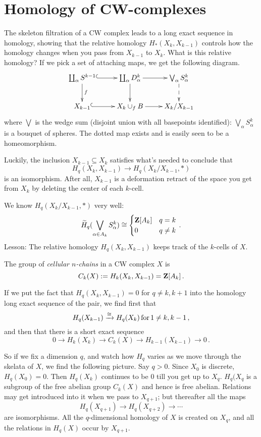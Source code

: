 \section{Homology of CW-complexes}


The skeleton filtration of a CW complex leads to a long exact sequence in 
homology, showing that the relative homology $H_*(X_k,X_{k-1})$ controls how
the homology changes when you  pass from $X_{k-1}$ to $X_k$. What is this
relative homology? If we pick a set of attaching maps, we get the following 
diagram.
\begin{equation*}
\xymatrix{\coprod_{\alpha}S^{k-1}\ar@{^(->}[r]\ar[d]^f & \coprod_{\alpha}D^k_\alpha\ar[r]\ar[d] & \bigvee_{\alpha}S^k_\alpha\ar@{-->}[d]\\
X_{k-1}\ar@{^(->}[r] & X_k\cup_f B\ar[r] & X_k/X_{k-1}}
\end{equation*}
where $\bigvee$ is the wedge sum (disjoint union with all basepoints identified): $\bigvee_{\alpha}S^k_\alpha$ is a bouquet of spheres. The dotted
map exists and is easily seen to be a homeomorphism. 

Luckily, the inclusion $X_{k-1}\subseteq X_k$ satisfies what's needed to conclude that 
\[
H_q(X_k,X_{k-1})\to H_q(X_k/X_{k-1},\ast)
\]
is an isomorphism. After all, $X_{k-1}$ is a deformation retract of the space 
you get from $X_k$ by deleting the center of each $k$-cell. 

We know $ H_q(X_k/X_{k-1},\ast)$ very well:
\[
\widetilde{ H}_q(\bigvee_{\alpha\in A_k}S^k_\alpha)\cong\begin{cases}\mathbf Z[A_k] & q=k \\ 0 & q\neq k\end{cases}\,.
\]
Lesson: The relative homology $ H_q(X_k,X_{k-1})$ keeps track of the $k$-cells of $X$.
\begin{definition}
The group of {\em cellular $n$-chains} in a CW complex $X$ is
\[
C_k(X):= H_k(X_k,X_{k-1})=\mathbf Z[A_k]\,.
\]
\end{definition}
If we put the fact that $H_q(X_k,X_{k-1})=0$ for $q\neq k,k+1$
into the homology long exact sequence of the pair, we find first that
\[
H_q(X_{k-1})\xrightarrow{\cong}H_q(X_k)\,\hbox{for}\,1\neq k,k-1\,,
\]
and then that there is a short exact sequence
\[
0\to H_k(X_k)\to C_k(X) \to H_{k-1}(X_{k-1}) \to 0\,.
\]

So if we fix a dimension $q$, and watch how $H_q$ varies as we move through the
skelata of $X$, we find the following picture. Say $q>0$. Since $X_0$ is
discrete, $H_q(X_0)=0$. Then $H_q(X_k)$ continues to be 0 till you get up to
$X_q$. $H_q(X_q$ is a subgroup of the free abelian group $C_k(X)$ and hence is
free abelian. Relations may get introduced into it when we pass to $X_{q+1}$; 
but thereafter all the maps 
\[
H_q(X_{q+1})\to H_q(X_{q+2})\to\cdots
\]
are isomorphisms. All the $q$-dimensional homology of $X$ is created on $X_q$,
and all the relations in $H_q(X)$ occur by $X_{q+1}$. 

